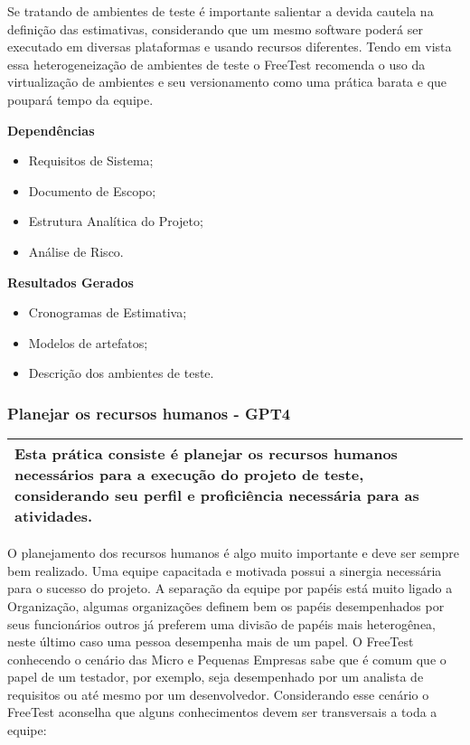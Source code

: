 Se tratando de ambientes de teste é importante salientar a devida cautela na definição das estimativas, considerando que um mesmo software poderá ser executado em diversas plataformas e usando recursos diferentes. Tendo em vista essa heterogeneização de ambientes de teste o FreeTest recomenda o uso da virtualização de ambientes e seu versionamento como uma prática barata e que poupará tempo da equipe.

\textbf{Dependências}
\begin{itemize}
\item Requisitos de Sistema;
\item Documento de Escopo;
\item Estrutura Analítica do Projeto;
\item Análise de Risco.
\end{itemize}

\textbf{Resultados Gerados}
\begin{itemize}
\item Cronogramas de Estimativa;
\item Modelos de artefatos;
\item Descrição dos ambientes de teste.
\end{itemize}

\subsubsection{Planejar os recursos humanos - GPT4}
\label{sec:gpt4}

\begin{table}[!ht]
\centering
\begin{tabular}{|p{130mm}|}
\hline
Esta prática consiste é planejar os recursos humanos necessários para a execução do projeto de teste, considerando seu perfil e proficiência necessária para as atividades. \\ 
\hline
\end{tabular}
\end{table}

O planejamento dos recursos humanos é algo muito importante e deve ser sempre bem realizado. Uma equipe capacitada e motivada possui a sinergia necessária para o sucesso do projeto. A separação da equipe por papéis está muito ligado a Organização, algumas organizações definem bem os papéis desempenhados por seus funcionários outros já preferem uma divisão de papéis mais heterogênea, neste último caso uma pessoa desempenha mais de um papel. O FreeTest conhecendo o cenário das Micro e Pequenas Empresas sabe que é comum que o papel de um testador, por exemplo, seja desempenhado por um analista de requisitos ou até mesmo por um desenvolvedor. Considerando esse cenário o FreeTest aconselha que alguns conhecimentos devem ser transversais a toda a equipe:

